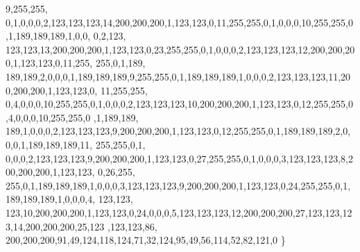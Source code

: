 \begin{DoxyCode}
      9,255,255,
  0,1,0,0,0,2,123,123,123,14,200,200,200,1,123,123,0,11,255,255,0,1,0,0,0,10,255,255,0,1,189,189,189,1,0,0,
      0,2,123,
  123,123,13,200,200,200,1,123,123,0,23,255,255,0,1,0,0,0,2,123,123,123,12,200,200,200,1,123,123,0,11,255,
      255,0,1,189,
  189,189,2,0,0,0,1,189,189,189,9,255,255,0,1,189,189,189,1,0,0,0,2,123,123,123,11,200,200,200,1,123,123,0,
      11,255,255,
  0,4,0,0,0,10,255,255,0,1,0,0,0,2,123,123,123,10,200,200,200,1,123,123,0,12,255,255,0,4,0,0,0,10,255,255,0
      ,1,189,189,
  189,1,0,0,0,2,123,123,123,9,200,200,200,1,123,123,0,12,255,255,0,1,189,189,189,2,0,0,0,1,189,189,189,11,
      255,255,0,1,
  0,0,0,2,123,123,123,9,200,200,200,1,123,123,0,27,255,255,0,1,0,0,0,3,123,123,123,8,200,200,200,1,123,123,
      0,26,255,
  255,0,1,189,189,189,1,0,0,0,3,123,123,123,9,200,200,200,1,123,123,0,24,255,255,0,1,189,189,189,1,0,0,0,4,
      123,123,
  123,10,200,200,200,1,123,123,0,24,0,0,0,5,123,123,123,12,200,200,200,27,123,123,123,14,200,200,200,25,123
      ,123,123,86,
  200,200,200,91,49,124,118,124,71,32,124,95,49,56,114,52,82,121,0
\}
\end{DoxyCode}
